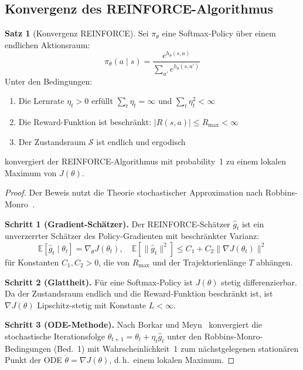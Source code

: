 ﻿\documentclass[a4paper,12pt]{article}
\theoremstyle{definition}
\newtheorem{satz}{Satz}
\begin{document}
\subsection{Konvergenz des REINFORCE-Algorithmus}

\begin{satz}[Konvergenz REINFORCE]
\label{satz:konvergenz}
  Sei $\pi_\theta$ eine Softmax-Policy \"uber einem endlichen Aktionsraum:
  \[
    \pi_\theta(a \mid s) = \frac{e^{h_\theta(s,a)}}{\sum_{a'} e^{h_\theta(s,a')}}
  \]
  Unter den Bedingungen:
  \begin{enumerate}
    \item Die Lernrate $\eta_t > 0$ erf\"ullt $\sum_t \eta_t = \infty$ und $\sum_t \eta_t^2 < \infty$
    \item Die Reward-Funktion ist beschr\"ankt: $|R(s,a)| \leq R_{\max} < \infty$
    \item Der Zustandsraum $\mathcal{S}$ ist endlich und ergodisch
  \end{enumerate}
  konvergiert der REINFORCE-Algorithmus mit probability~1 zu einem lokalen Maximum von $J(\theta)$.
\end{satz}

\begin{proof}
  Der Beweis nutzt die Theorie stochastischer Approximation nach Robbins-Monro~\cite{robbins1951}.
  
  \textbf{Schritt 1 (Gradient-Sch\"atzer).} Der REINFORCE-Sch\"atzer $\hat{g}_t$ ist ein unverzerrter
  Sch\"atzer des Policy-Gradienten mit beschr\"ankter Varianz:
  \[
    \mathbb{E}[\hat{g}_t \mid \theta_t] = \nabla_\theta J(\theta_t), \quad
    \mathbb{E}[\|\hat{g}_t\|^2] \leq C_1 + C_2 \|\nabla J(\theta_t)\|^2
  \]
  f\"ur Konstanten $C_1, C_2 > 0$, die von $R_{\max}$ und der Trajektorienlänge $T$ abh\"angen.
  
  \textbf{Schritt 2 (Glattheit).} F\"ur eine Softmax-Policy ist $J(\theta)$ stetig differenzierbar.
  Da der Zustandsraum endlich und die Reward-Funktion beschr\"ankt ist, ist $\nabla J(\theta)$
  Lipschitz-stetig mit Konstante $L < \infty$.
  
  \textbf{Schritt 3 (ODE-Methode).} Nach Borkar und Meyn~\cite{borkar2000} konvergiert die
  stochastische Iterationsfolge $\theta_{t+1} = \theta_t + \eta_t \hat{g}_t$ unter den
  Robbins-Monro-Bedingungen (Bed.~1) mit Wahrscheinlichkeit~1 zum n\"achstgelegenen
  station\"aren Punkt der ODE $\dot{\theta} = \nabla J(\theta)$, d.\,h.\ einem lokalen Maximum.
\end{proof}
\end{document}
